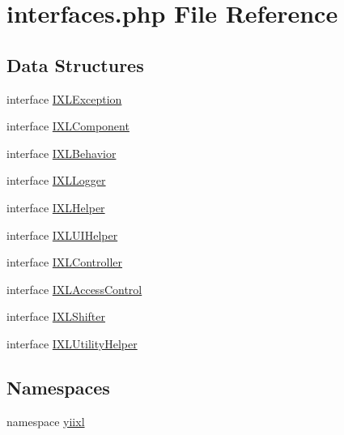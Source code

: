 \hypertarget{interfaces_8php}{
\section{interfaces.php File Reference}
\label{interfaces_8php}
}
\subsection*{Data Structures}
\begin{DoxyCompactItemize}
\item 
interface \hyperlink{interfaceIXLException}{IXLException}
\item 
interface \hyperlink{interfaceIXLComponent}{IXLComponent}
\item 
interface \hyperlink{interfaceIXLBehavior}{IXLBehavior}
\item 
interface \hyperlink{interfaceIXLLogger}{IXLLogger}
\item 
interface \hyperlink{interfaceIXLHelper}{IXLHelper}
\item 
interface \hyperlink{interfaceIXLUIHelper}{IXLUIHelper}
\item 
interface \hyperlink{interfaceIXLController}{IXLController}
\item 
interface \hyperlink{interfaceIXLAccessControl}{IXLAccessControl}
\item 
interface \hyperlink{interfaceIXLShifter}{IXLShifter}
\item 
interface \hyperlink{interfaceIXLUtilityHelper}{IXLUtilityHelper}
\end{DoxyCompactItemize}
\subsection*{Namespaces}
\begin{DoxyCompactItemize}
\item 
namespace \hyperlink{namespaceyiixl}{yiixl}
\end{DoxyCompactItemize}
